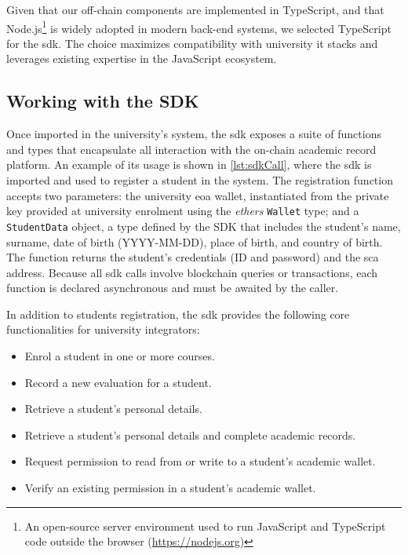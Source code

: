 Given that our off-chain components are implemented in TypeScript, and that Node.js\footnote{An open-source server environment used to run JavaScript and TypeScript code outside the browser (\url{https://nodejs.org})} is widely adopted in modern back-end systems, we selected TypeScript for the \acrshort{sdk}. The choice maximizes compatibility with university \acrshort{it} stacks and leverages existing expertise in the JavaScript ecosystem.

\subsection{Working with the SDK}
Once imported in the university's system, the \acrshort{sdk} exposes a suite of functions and types that encapsulate all interaction with the on-chain academic record platform. An example of its usage is shown in \cref{lst:sdkCall}, where the \acrshort{sdk} is imported and used to register a student in the system. The registration function accepts two parameters: the university \acrshort{eoa} wallet, instantiated from the private key provided at university enrolment using the \textit{ethers} \texttt{Wallet} type; and a \texttt{StudentData} object, a type defined by the SDK that includes the student’s name, surname, date of birth (YYYY-MM-DD), place of birth, and country of birth. The function returns the student's credentials (ID and password) and the \acrshort{sca} address. Because all \acrshort{sdk} calls involve blockchain queries or transactions, each function is declared asynchronous and must be awaited by the caller.



In addition to students registration, the \acrshort{sdk} provides the following core functionalities for university integrators:
\begin{itemize}
    \item Enrol a student in one or more courses.
    \item Record a new evaluation for a student.
    \item Retrieve a student’s personal details.
    \item Retrieve a student’s personal details and complete academic records.
    \item Request permission to read from or write to a student’s academic wallet.
    \item Verify an existing permission in a student’s academic wallet.
\end{itemize}

